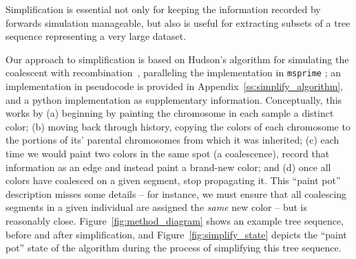 \documentclass{article}
\newcommand{\msprime}{\texttt{msprime}}
\begin{document}
Simplification is essential
not only for keeping the information recorded by forwards simulation manageable,
but also is useful for extracting subsets of a tree sequence representing a very large dataset.

Our approach to simplification is based on Hudson's algorithm for simulating
the coalescent with recombination~\citep{hudson1983properties},
paralleling the implementation in \msprime{} \citep{kelleher2016efficient};
an implementation in pseudocode is provided in Appendix~\ref{ss:simplify_algorithm},
and a python implementation as supplementary information.
Conceptually, this works by
(a) beginning by painting the chromosome in each sample a distinct color;
(b) moving back through history,
copying the colors of each chromosome to the portions of its' parental chromosomes
from which it was inherited;
(c) each time we would paint two colors in the same spot (a coalescence),
record that information as an edge and instead paint a brand-new color;
and
(d) once all colors have coalesced on a given segment,
stop propagating it.
This ``paint pot'' description misses some details --
for instance, we must ensure that all coalescing segments in a given individual
are assigned the \emph{same} new color --
but is reasonably close.
Figure~\ref{fig:method_diagram} shows an example tree sequence,
before and after simplification,
and Figure~\ref{fig:simplify_state} depicts the ``paint pot'' state of the algorithm
during the process of simplifying this tree sequence.
\end{document}
